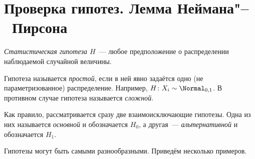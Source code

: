 \section{Проверка гипотез. Лемма Неймана"--~Пирсона}

\begin{defn}
    \textit{Статистическая гипотеза $H$}~--- любое предположение о распределении наблюдаемой случайной величины.
    
    Гипотеза называется \textit{простой}, если в ней явно задаётся одно (не параметризованное) распределение. 
    Например, $H\colon X_i \sim \Normal_{0, 1}$. 
    В противном случае гипотеза называется \textit{сложной}.

    Как правило, рассматривается сразу две взаимоисключающие гипотезы.
    Одна из них называется \textit{основной} и обозначается $H_0$, а другая~--- \textit{альтернативной} и обозначается $H_1$.
\end{defn}

Гипотезы могут быть самыми разнообразными.
Приведём несколько примеров.

